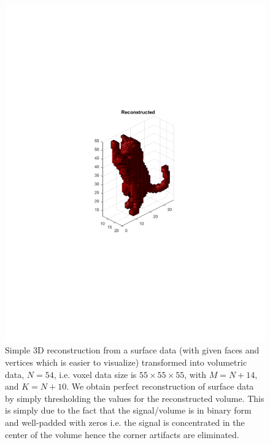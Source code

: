 \documentclass{UCF_ETD}
\begin{document}
\begin{figure}[H]
\begin{center}
 \includegraphics[scale=0.7]{PolarSphericalDFT/ThreeDOriginalVoxelDataReconstructed}
 \caption{Simple 3D reconstruction from a surface data (with given faces and vertices which is easier to visualize) transformed into volumetric data, $N = 54$, i.e. voxel data size is $55 \times 55 \times 55$, with $M = N+14$, and $K = N+10$. We obtain perfect reconstruction of surface data by simply thresholding the values for the reconstructed volume. This is simply due to the fact that the signal/volume is in binary form and well-padded with zeros i.e. the signal is concentrated in the center of the volume hence the corner artifacts are eliminated.}
 \label{3DReconstruction}
 \end{center}
 \end{figure}
 
\end{document}
